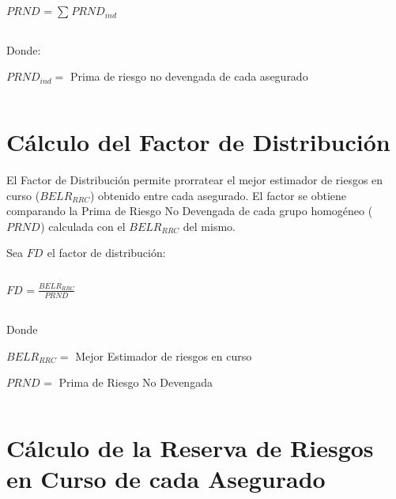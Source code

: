 \documentclass[11pt,twoside,openright,spanish]{report}
\numberwithin{equation}{chapter}
\numberwithin{figure}{chapter}
\numberwithin{table}{chapter}
\begin{document}
	
		{\centering
	$PRND_{}={\sum _{}^{}PRND_{ind}^{}}$
	
		\noindent
	
}	

	
	\doublespacing

$ $

\doublespacing
	
	Donde:
	
	\doublespacing
	
	$PRND_{ind}=$ Prima de riesgo no devengada de cada asegurado
	
	\doublespacing

$ $

\doublespacing
	
	\section{Cálculo del Factor de Distribución}
	
	\doublespacing
	
	El Factor de Distribución permite prorratear el mejor estimador de riesgos en curso ($BELR_{RRC}$) obtenido entre cada asegurado. El factor se obtiene comparando la Prima de Riesgo No Devengada de cada grupo homogéneo ($PRND_{}$) calculada con el $BELR_{RRC}$ del mismo.
	
	\doublespacing
	
	Sea $FD_{}$ el factor de distribución:
	
	\doublespacing

$ $

\doublespacing
	
		{\centering
		${FD}_{}^{}=\frac{{BELR}_{RRC}^{}}{{PRND}_{}}$
		\noindent
		
	}	
	
	
	\doublespacing

$ $

\doublespacing
	
	Donde
	
	\doublespacing
	
		$BELR_{RRC}=$ Mejor Estimador de riesgos en curso
		
		$PRND_{}=$ Prima de Riesgo No Devengada
		
	\doublespacing

$ $

\doublespacing
	
	\section{Cálculo de la Reserva de Riesgos en Curso de cada Asegurado}
	
\end{document}
